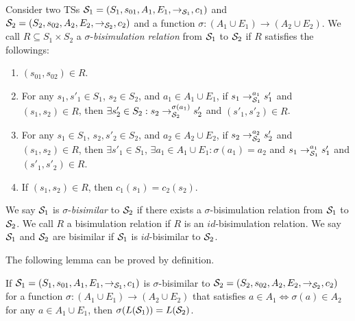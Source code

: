 Consider two TSs
${\cal S}_1=(S_1,s_{01},A_1,E_1,{\to_{{\cal S}_1}},c_1)$ and
${\cal S}_2=(S_2,s_{02},A_2,E_2,{\to_{{\cal S}_2}},\allowbreak c_2)$
and
a function $\sigma:(A_1\cup E_1)\to(A_2\cup E_2)$.
We call $R\subseteq S_1\times S_2$
a $\sigma$-\emph{bisimulation relation} from ${\cal S}_1$ to ${\cal S}_2$
if $R$ satisfies the followings:
\begin{enumerate}[label=(\arabic*)]
\item $(s_{01},s_{02})\in R$.
\item For any $s_1,s'_1\in S_1$, $s_2\in S_2$, and
  $a_1\in A_1\cup E_1$,
  if $s_1\to_{{\cal S}_1}^{a_1} s'_1$ and $(s_1,s_2)\in R$,
  then $\exists s'_2\in S_2: s_2\to_{{\cal S}_2}^{\sigma(a_1)} s'_2$
  and $(s'_1,s'_2)\in R$.
\item For any $s_1\in S_1$, $s_2,s'_2\in S_2$, and
  $a_2\in A_2\cup E_2$,
  if $s_2\to_{{\cal S}_2}^{a_2} s'_2$ and $(s_1,s_2)\in R$,
  then $\exists s'_1\in S_1$, $\exists a_1\in A_1\cup E_1:
  \sigma(a_1)=a_2$ and
  $s_1\to_{{\cal S}_1}^{a_1} s'_1$
  and $(s'_1,s'_2)\in R$.
\item If $(s_1,s_2)\in R$, then $c_1(s_1)=c_2(s_2)$.
\end{enumerate}
%
We say ${\cal S}_1$ is $\sigma$-\emph{bisimilar} to
${\cal S}_2$ if there exists a $\sigma$-bisimulation relation
from ${\cal S}_1$ to ${\cal S}_2$.
%
We call $R$ a bisimulation relation
if $R$ is an $\mathit{id}$-bisimulation relation.
We say ${\cal S}_1$ and ${\cal S}_2$ are bisimilar if
${\cal S}_1$ is $\mathit{id}$-bisimilar to ${\cal S}_2$.

The following lemma can be proved by definition.
\begin{lemma}\label{lemma:bisim-lang}
If
${\cal S}_1=(S_1,s_{01},A_1,E_1,{\to_{{\cal S}_1}},c_1)$ is
$\sigma$-bisimilar to
${\cal S}_2=(S_2,s_{02},A_2,\allowbreak E_2,{\to_{{\cal S}_2}},c_2)$
for
a function $\sigma:(A_1\cup E_1)\to(A_2\cup E_2)$
that satisfies $a\in A_1 \Leftrightarrow \sigma(a)\in A_2$
for any $a\in A_1\cup E_1$,
then
$\sigma(L({\cal S}_1))=L({\cal S}_2)$.
\end{lemma}






